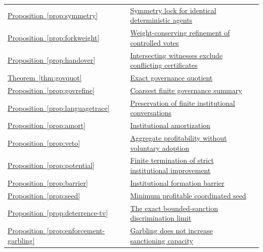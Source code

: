 \begin{longtable}{@{}P{.19\linewidth}P{.69\linewidth}r@{}}
\hyperref[prop:symmetry]{Proposition~\ref*{prop:symmetry}} & \hyperref[prop:symmetry]{Symmetry lock for identical deterministic agents} & \pageref{prop:symmetry}\\
\hyperref[prop:forkweight]{Proposition~\ref*{prop:forkweight}} & \hyperref[prop:forkweight]{Weight-conserving refinement of controlled votes} & \pageref{prop:forkweight}\\
\hyperref[prop:handover]{Proposition~\ref*{prop:handover}} & \hyperref[prop:handover]{Intersecting witnesses exclude conflicting certificates} & \pageref{prop:handover}\\
\hyperref[thm:govquot]{Theorem~\ref*{thm:govquot}} & \hyperref[thm:govquot]{Exact governance quotient} & \pageref{thm:govquot}\\
\hyperref[prop:govrefine]{Proposition~\ref*{prop:govrefine}} & \hyperref[prop:govrefine]{Coarsest finite governance summary} & \pageref{prop:govrefine}\\
\hyperref[prop:languagetrace]{Proposition~\ref*{prop:languagetrace}} & \hyperref[prop:languagetrace]{Preservation of finite institutional conversations} & \pageref{prop:languagetrace}\\
\hyperref[prop:amort]{Proposition~\ref*{prop:amort}} & \hyperref[prop:amort]{Institutional amortization} & \pageref{prop:amort}\\
\hyperref[prop:veto]{Proposition~\ref*{prop:veto}} & \hyperref[prop:veto]{Aggregate profitability without voluntary adoption} & \pageref{prop:veto}\\
\hyperref[prop:potential]{Proposition~\ref*{prop:potential}} & \hyperref[prop:potential]{Finite termination of strict institutional improvement} & \pageref{prop:potential}\\
\hyperref[prop:barrier]{Proposition~\ref*{prop:barrier}} & \hyperref[prop:barrier]{Institutional formation barrier} & \pageref{prop:barrier}\\
\hyperref[prop:seed]{Proposition~\ref*{prop:seed}} & \hyperref[prop:seed]{Minimum profitable coordinated seed} & \pageref{prop:seed}\\
\hyperref[prop:deterrence-tv]{Proposition~\ref*{prop:deterrence-tv}} & \hyperref[prop:deterrence-tv]{The exact bounded-sanction discrimination limit} & \pageref{prop:deterrence-tv}\\
\hyperref[prop:enforcement-garbling]{Proposition~\ref*{prop:enforcement-garbling}} & \hyperref[prop:enforcement-garbling]{Garbling does not increase sanctioning capacity} & \pageref{prop:enforcement-garbling}\\

\end{longtable}
